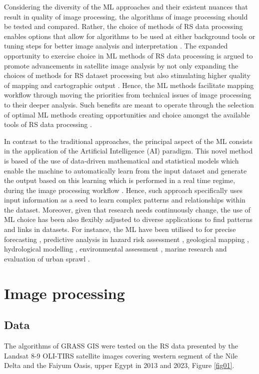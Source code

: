 \documentclass[final,5p,times,twocolumn]{elsarticle}
\begin{document}
Considering the diversity of the ML approaches and their existent nuances that result in quality of image processing, the algorithms of image processing should be tested and compared. Rather, the choice of methods of RS data processing enables options that allow for algorithms to be used at either background tools or tuning steps for better image analysis and interpretation \cite{rs16010184,Lemenkova202310,rs16010127}. The expanded opportunity to exercise choice in ML methods of RS data processing is argued to promote advancements in satellite image analysis by not only expanding the choices of methods for RS dataset processing but also stimulating higher quality of mapping and cartographic output \cite{TSELKA2023131,Lemenkova202021,10292983}. Hence, the ML methods facilitate mapping workflow through moving the priorities from technical issues of image processing to their deeper analysis. Such benefits are meant to operate through the selection of optimal ML methods creating opportunities and choice amongst the available tools of RS data processing \cite{WU2023110723}.

In contrast to the traditional approaches, the principal aspect of the ML consists in the application of the Artificial Intelligence (AI) paradigm. This novel method is based of the use of data-driven mathematical and statistical models which enable the machine to automatically learn from the input dataset and generate the output based on this learning which is performed in a real time regime, during the image processing workflow \cite{DOSSANTOS2022106753,ROCHA2022107415}. Hence, such approach specifically uses input information as a seed to learn complex patterns and relationships within the dataset. Moreover, given that research needs continuously change, the use of ML choice has been also flexibly adjusted to diverse applications to find patterns and links in datasets. For instance, the ML have been utilised to for precise forecasting \cite{LATIF202316}, predictive analysis in hazard risk assessment \cite{XIONG2021145256,WU2024103612}, geological mapping \cite{HAN202387}, hydrological modelling \cite{RAFIK2023101569,AOURAGH2023100939}, environmental assessment \cite{AMANI2023108324}, marine research \cite{ERDEM2021964} and evaluation of urban sprawl \cite{LI2023104653}. 

\section{Image processing}

\subsection{Data}
The algorithms of GRASS GIS were tested on the RS data presented by the Landsat 8-9 OLI-TIRS satellite images covering western segment of the Nile Delta and the Faiyum Oasis, upper Egypt in 2013 and 2023, Figure \ref{fig01}. 
\end{document}
